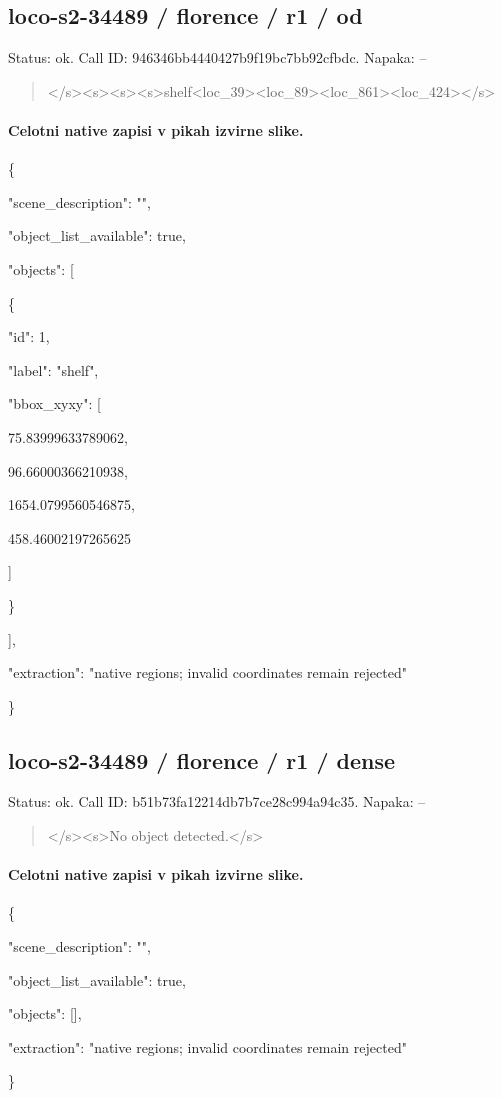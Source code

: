 \documentclass[10pt,a4paper]{article}
\begin{document}
\subsection*{loco-s2-34489 / florence / r1 / od}
Status: ok. Call ID: 946346bb4440427b9f19bc7bb92cfbdc. Napaka: --
\begin{quote}\footnotesize
</s>\allowbreak{}<s>\allowbreak{}<s>\allowbreak{}<s>\allowbreak{}shelf<loc\_39>\allowbreak{}<loc\_8\allowbreak{}9>\allowbreak{}<loc\_861>\allowbreak{}<loc\_424>\allowbreak{}</s>\allowbreak{}
\end{quote}
\paragraph{Celotni native zapisi v pikah izvirne slike.}
\{\par
  "scene\_description":\allowbreak{} "",\allowbreak{}\par
  "object\_list\_available":\allowbreak{} true,\allowbreak{}\par
  "objects":\allowbreak{} [\par
    \{\par
      "id":\allowbreak{} 1,\allowbreak{}\par
      "label":\allowbreak{} "shelf",\allowbreak{}\par
      "bbox\_xyxy":\allowbreak{} [\par
        75.83999633789062,\allowbreak{}\par
        96.66000366210938,\allowbreak{}\par
        1654.0799560546875,\allowbreak{}\par
        458.46002197265625\par
      ]\par
    \}\par
  ],\allowbreak{}\par
  "extraction":\allowbreak{} "native regions; invalid coordinates remain rejected"\par
\}
\subsection*{loco-s2-34489 / florence / r1 / dense}
Status: ok. Call ID: b51b73fa12214db7b7ce28c994a94c35. Napaka: --
\begin{quote}\footnotesize
</s>\allowbreak{}<s>\allowbreak{}No object detected.</s>\allowbreak{}
\end{quote}
\paragraph{Celotni native zapisi v pikah izvirne slike.}
\{\par
  "scene\_description":\allowbreak{} "",\allowbreak{}\par
  "object\_list\_available":\allowbreak{} true,\allowbreak{}\par
  "objects":\allowbreak{} [],\allowbreak{}\par
  "extraction":\allowbreak{} "native regions; invalid coordinates remain rejected"\par
\}
\end{document}
